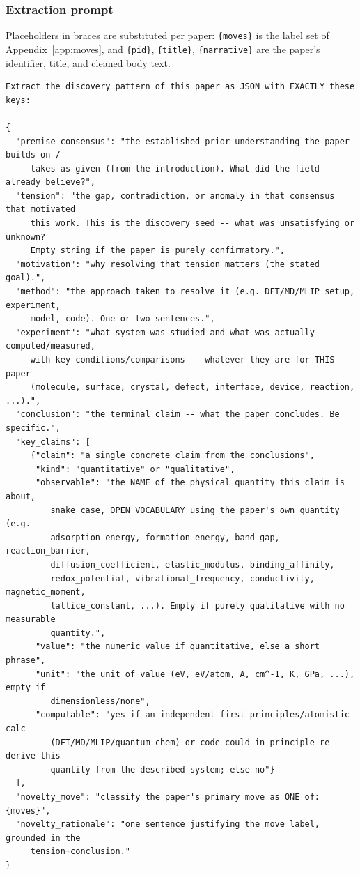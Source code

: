\subsubsection{Extraction prompt}

Placeholders in braces are substituted per paper: \texttt{\{moves\}} is the label set of
Appendix~\ref{app:moves}, and \texttt{\{pid\}}, \texttt{\{title\}}, \texttt{\{narrative\}} are
the paper's identifier, title, and cleaned body text.

\begin{lstlisting}[style=prompt]
Extract the discovery pattern of this paper as JSON with EXACTLY these keys:

{
  "premise_consensus": "the established prior understanding the paper builds on /
     takes as given (from the introduction). What did the field already believe?",
  "tension": "the gap, contradiction, or anomaly in that consensus that motivated
     this work. This is the discovery seed -- what was unsatisfying or unknown?
     Empty string if the paper is purely confirmatory.",
  "motivation": "why resolving that tension matters (the stated goal).",
  "method": "the approach taken to resolve it (e.g. DFT/MD/MLIP setup, experiment,
     model, code). One or two sentences.",
  "experiment": "what system was studied and what was actually computed/measured,
     with key conditions/comparisons -- whatever they are for THIS paper
     (molecule, surface, crystal, defect, interface, device, reaction, ...).",
  "conclusion": "the terminal claim -- what the paper concludes. Be specific.",
  "key_claims": [
     {"claim": "a single concrete claim from the conclusions",
      "kind": "quantitative" or "qualitative",
      "observable": "the NAME of the physical quantity this claim is about,
         snake_case, OPEN VOCABULARY using the paper's own quantity (e.g.
         adsorption_energy, formation_energy, band_gap, reaction_barrier,
         diffusion_coefficient, elastic_modulus, binding_affinity,
         redox_potential, vibrational_frequency, conductivity, magnetic_moment,
         lattice_constant, ...). Empty if purely qualitative with no measurable
         quantity.",
      "value": "the numeric value if quantitative, else a short phrase",
      "unit": "the unit of value (eV, eV/atom, A, cm^-1, K, GPa, ...), empty if
         dimensionless/none",
      "computable": "yes if an independent first-principles/atomistic calc
         (DFT/MD/MLIP/quantum-chem) or code could in principle re-derive this
         quantity from the described system; else no"}
  ],
  "novelty_move": "classify the paper's primary move as ONE of: {moves}",
  "novelty_rationale": "one sentence justifying the move label, grounded in the
     tension+conclusion."
}


\end{lstlisting}
